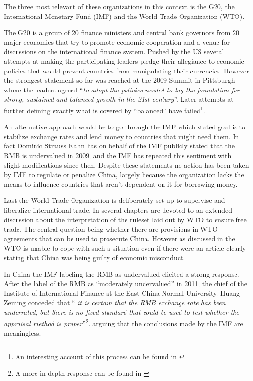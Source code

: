 The three most relevant of these organizations in this context is the 
G20, the International Monetary Fund (IMF) and the World Trade 
Organization (WTO).

The G20 is a group of 20 finance ministers and central bank governors 
from 20 major economies that try to promote economic cooperation and a 
venue for discussions on the international finance system. Pushed by the 
US several attempts at making the participating leaders pledge their 
allegiance to economic policies that would prevent countries from 
manipulating their currencies. However the strongest statement so far 
was reached at the 2009 Summit in Pittsburgh where the leaders agreed 
``\textit{to adopt the policies needed to lay the foundation for strong, 
sustained and balanced growth in the 21st century}''. Later attempts at 
further defining exactly what is covered by ``balanced'' have 
failed\footnote{An interesting account of this process can be found in 
\cite{Levy11}}.

An alternative approach would be to go through the IMF which stated goal 
is to stabilize exchange rates and lend money to countries that might 
need them. In fact Dominic Strauss Kahn has on behalf of the IMF 
publicly stated that the RMB is undervalued in 2009, and the IMF has 
repeated this sentiment with slight modifications since 
then\cite{reuters09}.  Despite these statements no action has been taken 
by IMF to regulate or penalize China, largely because the organization 
lacks the means to influence countries that aren't dependent on it for 
borrowing money.

Last the World Trade Organization is deliberately set up to supervise 
and liberalize international trade. In \cite{Evenett10} several chapters 
are devoted to an extended discussion about the interpretation of the 
ruleset laid out by WTO to ensure free trade. The central question being 
whether there are provisions in WTO agreements that can be used to 
prosecute China.  However as discussed in \cite{Levy11} the WTO is 
unable to cope with such a situation even if there were an article 
clearly stating that China was being guilty of economic misconduct.

In China the IMF labeling the RMB as undervalued elicited a strong 
response. After the label of the RMB as ``moderately undervalued'' in 
2011, the chief of the Institute of International Finance at the East 
China Normal University, Huang Zeming conceded that ``\textit{ it is 
	certain that the RMB exchange rate has been underrated, but there is 
	no fixed standard that could be used to test whether the appraisal 
method is proper}''\footnote{A more in depth response can be found in 
\cite{ChinaDaily11}}, arguing that the conclusions made by the IMF are 
meaningless.

